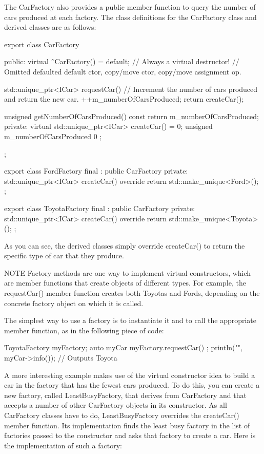 The CarFactory also provides a public member function to query the number of cars produced at each factory. The class definitions for the CarFactory class and derived classes are as follows:

\begin{cpp}
export class CarFactory
{
    public:
        virtual ˜CarFactory() = default; // Always a virtual destructor!
        // Omitted defaulted default ctor, copy/move ctor, copy/move assignment op.

        std::unique_ptr<ICar> requestCar()
        {
            // Increment the number of cars produced and return the new car.
            ++m_numberOfCarsProduced;
            return createCar();
        }

        unsigned getNumberOfCarsProduced() const { return m_numberOfCarsProduced; }
    private:
        virtual std::unique_ptr<ICar> createCar() = 0;
        unsigned m_numberOfCarsProduced { 0 };
};

export class FordFactory final : public CarFactory
{
    private:
        std::unique_ptr<ICar> createCar() override {
            return std::make_unique<Ford>(); }
};

export class ToyotaFactory final : public CarFactory
{
    private:
        std::unique_ptr<ICar> createCar() override {
            return std::make_unique<Toyota>(); }
};
\end{cpp}

As you can see, the derived classes simply override createCar() to return the specific type of car that they produce.

\begin{myNotic}{NOTE}
Factory methods are one way to implement virtual constructors, which are member functions that create objects of different types. For example, the requestCar() member function creates both Toyotas and Fords, depending on the concrete factory object on which it is called.
\end{myNotic}


The simplest way to use a factory is to instantiate it and to call the appropriate member function, as in the following piece of code:

\begin{cpp}
ToyotaFactory myFactory;
auto myCar { myFactory.requestCar() };
println("{}", myCar->info()); // Outputs Toyota
\end{cpp}

A more interesting example makes use of the virtual constructor idea to build a car in the factory that has the fewest cars produced. To do this, you can create a new factory, called LeastBusyFactory, that derives from CarFactory and that accepts a number of other CarFactory objects in its constructor. As all CarFactory classes have to do, LeastBusyFactory overrides the createCar() member function. Its implementation finds the least busy factory in the list of factories passed to the constructor and asks that factory to create a car. Here is the implementation of such a factory:

